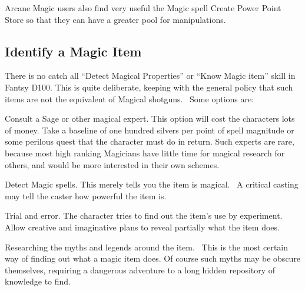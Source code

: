 Arcane Magic users also find very useful the Magic spell Create Power Point Store so that they can have a greater pool for manipulations.

\subsection{Identify a Magic Item}
There is no catch all “Detect Magical Properties” or “Know Magic item” skill in Fantsy D100. This is quite deliberate, keeping with the general policy that such items are not the equivalent of Magical shotguns.  Some options are:

Consult a Sage or other magical expert. This option will cost the characters lots of money. Take a baseline of one hundred silvers per point of spell magnitude or some perilous quest that the character must do in return. Such experts are rare, because most high ranking Magicians have little time for magical research for others, and would be more interested in their own schemes. 

Detect Magic spells. This merely tells you the item is magical.  A critical casting may tell the caster how powerful the item is.

Trial and error. The character tries to find out the item’s use by experiment. Allow creative and imaginative plans to reveal partially what the item does.

Researching the myths and legends around the item.  This is the most certain way of finding out what a magic item does. Of course such myths may be obscure themselves, requiring a dangerous adventure to a long hidden repository of knowledge to find.

